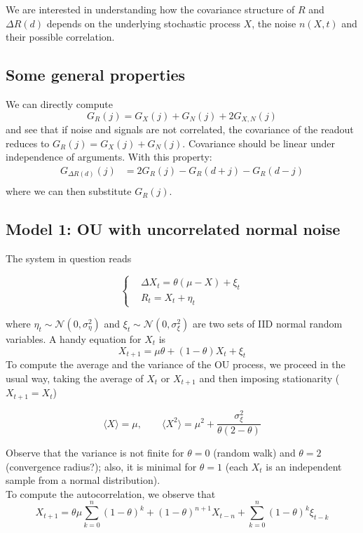 \documentclass[a4paper, 10pt]{article}
\newcommand{\avg}[1]{\langle#1\rangle}
\newcommand{\N}{\mathcal{N}}
\newcommand{\sigmaxi}{\sigma_{\xi}}
\newcommand{\sigmaeta}{\sigma_{\eta}}
\begin{document}
  We are interested in understanding how the covariance structure of $R$ and
  $\Delta R(d)$ depends on the underlying stochastic process $X$, the noise
  $n(X,t)$ and their possible correlation.

  \subsection{Some general properties}
  We can directly compute
  \begin{equation}
    G_R(j) = G_X(j) + G_N(j) + 2 G_{X,N}(j)
  \end{equation}
  and see that if noise and signals are not correlated, the covariance of the
  readout reduces to $G_R(j) = G_X(j) + G_N(j)$. Covariance should be linear
  under independence of arguments. With this property:
  \begin{align}
    G_{\Delta R(d)}(j) &= 2 G_R(j) - G_{R}(d+j) - G_{R}(d-j)\\
  \end{align}
  where we can then substitute $G_R(j)$.

  \subsection{Model 1: OU with uncorrelated normal noise}
  The system in question reads

  \begin{equation}
    \begin{cases}
      &\Delta X_{t} = \theta (\mu - X) + \xi_t\\
      &R_{t} = X_t + \eta_t
    \end{cases}
  \end{equation}

  where $\eta_t \sim \N(0,\sigmaeta^2)$ and $\xi_t \sim \N(0,\sigmaxi^2)$ are
  two sets of IID normal random variables.
  A handy equation for $X_t$ is
  \begin{equation}
    X_{t+1} = \mu \theta + (1-\theta) X_t + \xi_t
  \end{equation}
  To compute the average and the variance of the OU process, we proceed in the
  usual way, taking the average of $X_t$ or $X_{t+1}$ and then imposing
  stationarity ($X_{t+1} = X_t$)
  
  \begin{equation}
    \avg{X} = \mu, \qquad
    \avg{X^2} = \mu^2 + \frac{\sigmaxi^2}{\theta(2-\theta)}
  \end{equation}

  Observe that the variance is not finite for $\theta = 0$ (random walk) and
  $\theta = 2$ (convergence radius?); also, it is minimal for $\theta = 1$
  (each $X_t$ is an independent sample from a normal distribution).\\
  To compute the autocorrelation, we observe that
  \begin{equation}
    X_{t+1} = \theta \mu \sum_{k=0}^{n} (1-\theta)^k +
    (1-\theta)^{n+1} X_{t-n} + \sum_{k=0}^{n} (1-\theta)^k \xi_{t-k}
  \end{equation}
  
\end{document}
